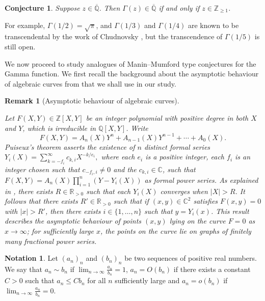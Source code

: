 \documentclass[11pt,reqno]{amsart}
\newtheorem{conjecture}[theorem]{Conjecture}
\newtheorem{remark}[theorem]{Remark}
\theoremstyle{definition}
\newtheorem{notation}[theorem]{Notation}
\numberwithin{equation}{section}
\newcommand{\Z}{\mathbb{Z}}
\newcommand{\Q}{\mathbb{Q}}
\begin{document}
\begin{conjecture} \label{bialg}
Suppose $z \in \overline{\mathbb Q}$. Then $\Gamma(z) \in \overline{\mathbb Q}$ if and only if $z \in \Z_{\geq 1}$. 
\end{conjecture}

For example, $\Gamma(1/2)=\sqrt{\pi}$, and $\Gamma(1/3)$ and $\Gamma(1/4)$ are known to be transcendental by the work of Chudnovsky \cite{Chu76},  but the transcendence of $\Gamma(1/5)$ is still open. 


We now proceed to study analogues of Manin--Mumford type conjectures for the Gamma function.  We first recall the  background about the asymptotic behaviour of algebraic curves from \cite[Section 3]{Wal92} that we shall use in our study. 






\begin{remark}[Asymptotic behaviour of algebraic curves]\label{asymp}

Let $F(X, Y) \in \Z[X, Y]$ be an integer polynomial with positive degree in both $X$ and $Y$, which is irreducible in $\Q[X, Y]$. Write
$$
F(X, Y)= A_n(X) Y^n+A_{n-1}(X)Y^{n-1}+ \cdots +A_0(X). 
$$
Puiseux's theorem asserts the existence of $n$ distinct formal series 
$
Y_i(X) = \sum_{k=-f_i}^{\infty} c_{k, i} X^{-k/e_i}, 
$
 where each $e_i$ is a positive integer, each $f_i$ is an integer chosen such that $c_{-f_i, i} \neq 0$ and the $c_{k, i} \in \mathbb C$, such that 
$\displaystyle{
F(X, Y) = A_n(X) \prod_{i=1}^n (Y-Y_i(X))}$ as formal power series. As explained in \cite[page 162]{Wal92}, there exists  $R \in \mathbb R_{>0}$ such that each $Y_i(X)$ converges when $|X|>R$. It follows that there exists $R' \in \mathbb R_{>0}$  such that if  $(x, y) \in \mathbb C^2$ satisfies $F(x, y)=0$ with $|x|>R'$, then there exists $i \in \{1, \ldots, n\}$ such that $y=Y_i(x)$. This result describes the asymptotic behaviour of points $(x, y)$ lying on the curve $F=0$ as $x \to \infty$; for sufficiently large $x$, the points on the curve lie on graphs of finitely many fractional power series. 

\end{remark}

\begin{notation}
Let $(a_n)_n$ and $(b_n)_n$ be two sequences of positive real numbers. We say that $a_n \sim b_n$ if $\lim_{n \to \infty} \frac{a_n}{b_n}=1$, $a_n=O(b_n)$ if there exists a constant $C > 0$ such that $a_n \leqslant C b_n$ for all $n$ sufficiently large and $a_n= o(b_n)$ if  $\lim_{n \to \infty} \frac{a_n}{b_n}=0$. 
\end{notation}
\end{document}
